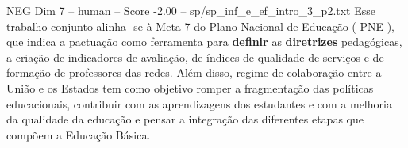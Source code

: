 \begin{textsample}{NEG Dim 7 – human – Score -2.00 – sp/sp\_inf\_e\_ef\_intro\_3\_p2.txt}  \label{ex:f7_neg_016}
Esse trabalho conjunto alinha -se à Meta 7 do Plano Nacional de Educação ( PNE ), que indica a pactuação como ferramenta para \textbf{definir} as \textbf{diretrizes} pedagógicas, a criação de indicadores de avaliação, de índices de qualidade de serviços e de formação de professores das redes.
Além disso, regime de colaboração entre a União e os Estados tem como objetivo romper a fragmentação das políticas educacionais, contribuir com as aprendizagens dos estudantes e com a melhoria da qualidade da educação e pensar a integração das diferentes etapas que compõem a Educação Básica.

\end{textsample}
